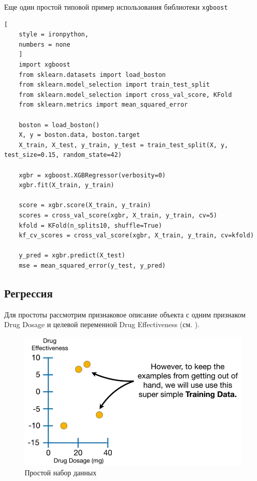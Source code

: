 \documentclass[%
	11pt,
	a4paper,
	utf8,
		]{article}
\begin{document}
Еще один простой типовой пример использования библиотеки \texttt{xgboost}
\begin{lstlisting}[
	style = ironpython,
	numbers = none
	]
	import xgboost
	from sklearn.datasets import load_boston
	from sklearn.model_selection import train_test_split
	from sklearn.model_selection import cross_val_score, KFold
	from sklearn.metrics import mean_squared_error
	
	boston = load_boston()
	X, y = boston.data, boston.target
	X_train, X_test, y_train, y_test = train_test_split(X, y, test_size=0.15, random_state=42)
	
	xgbr = xgboost.XGBRegressor(verbosity=0)
	xgbr.fit(X_train, y_train)
	
	score = xgbr.score(X_train, y_train)
	scores = cross_val_score(xgbr, X_train, y_train, cv=5)
	kfold = KFold(n_splits10, shuffle=True)
	kf_cv_scores = cross_val_score(xgbr, X_train, y_train, cv=kfold)
	
	y_pred = xgbr.predict(X_test)
	mse = mean_squared_error(y_test, y_pred)
\end{lstlisting}

\subsection{Регрессия}

Для простоты рассмотрим признаковое описание объекта с одним признаком Drug Dosage и целевой переменной Drug Effectiveness (см. ).

\begin{figure}[h]
	\centering
	\includegraphics[scale=0.35]{figures/xgboost_train_data.png}
	\caption{ Простой набор данных }\label{fig:xgboost_train_data}
\end{figure}
\end{document}
